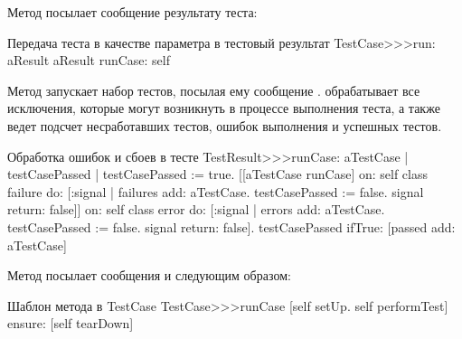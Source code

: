 \documentclass[a4paper,10pt,twoside]{book}
\begin{document}

Метод  посылает сообщение  результату теста:

\begin{method}[testcaserun:]{Передача теста в качестве параметра в тестовый результат}
TestCase>>>run: aResult
	aResult runCase: self
\end{method}

Метод  запускает набор тестов, посылая ему сообщение . 
 обрабатывает все исключения, которые могут возникнуть в процессе выполнения теста, а 
также ведет подсчет несработавших тестов, ошибок выполнения и успешных тестов.

\begin{method}[testresultruncase]{Обработка ошибок и сбоев в тесте}
TestResult>>>runCase: aTestCase
	| testCasePassed |
	testCasePassed := true.
	[[aTestCase runCase] 
			on: self class failure
			do: 
				[:signal | 
				failures add: aTestCase.
				testCasePassed := false.
				signal return: false]]
					on: self class error
					do:
						[:signal |
						errors add: aTestCase.
						testCasePassed := false.
						signal return: false].
	testCasePassed ifTrue: [passed add: aTestCase]
\end{method}

Метод  посылает сообщения 
и  следующим образом:

\begin{method}[testcaseruncase]{Шаблон метода в TestCase}
TestCase>>>runCase
	[self setUp.
	self performTest] ensure: [self tearDown]
\end{method}
\end{document}
